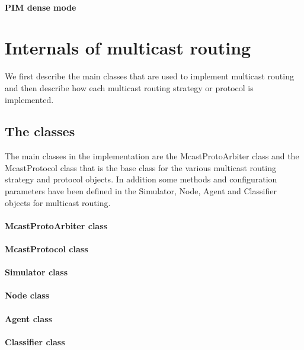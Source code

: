 \paragraph{PIM dense mode}

\section{Internals of multicast routing}
\label{sec:mcast-internals}

We first describe the main classes that are
used to implement multicast routing and
then describe how each multicast routing strategy
or protocol is implemented.

\subsection{The classes}
The main classes in the implementation are
the McastProtoArbiter class and the McastProtocol class 
that is the base class for the
various multicast routing strategy and protocol objects.
In addition some methods and configuration parameters
have been defined in the Simulator, Node, Agent 
and Classifier objects for multicast routing.

\paragraph{McastProtoArbiter class}

\paragraph{McastProtocol class}

\paragraph{Simulator class}

\paragraph{Node class}

\paragraph{Agent class}

\paragraph{Classifier class}

